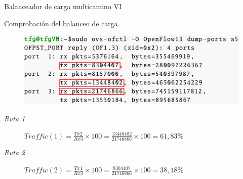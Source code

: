 \documentclass[10pt,spanish,xcolor={svgnames}]{beamer}
\newcommand{\nologo}{\setbeamertemplate{logo}{}} %
\begin{document}
{\nologo %
\begin{frame}{Balanceador de carga multicamino VI}
\begin{exampleblock}{\centering Comprobación del balanceo de carga.}
\begin{figure}[h!]
	\centering
	\includegraphics[width=1\textwidth]{Imagenes/dump_ports_balanceado.png}
\end{figure}

\begin{description}%
	\item[\textit{Ruta 1}]  $Traffic(1)=\frac{Tx2}{Rx3}\times{100}=\frac{13448402}{21746866}\times{100}=61,83\% $
	
	\item[\textit{Ruta 2}] $Traffic(2)=\frac{Tx1}{Rx3}\times{100}=\frac{8304407}{21746866}\times{100}=38,18\% $
\end{description}
\end{exampleblock}
\note{\large \vfill
	\begin{center}
		\begin{enumerate}
			\item  
			\vspace{2em}	
			\item
			\vspace{2em}
			\item  
			\vspace{2em}
			\vfill
		\end{enumerate}
\end{center}}
\end{frame}
} %
\end{document}
